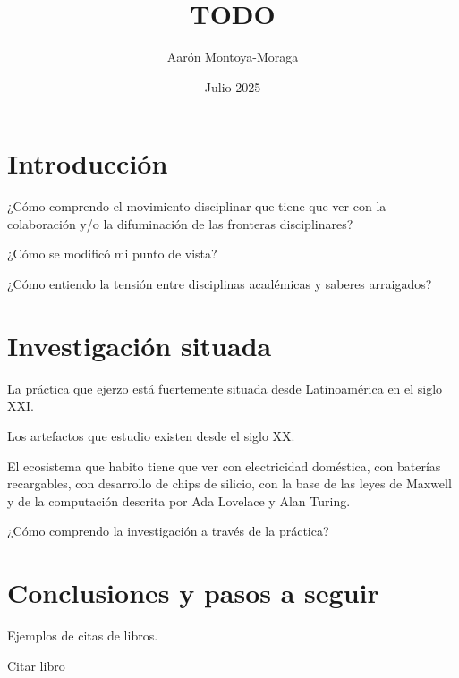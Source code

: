 \documentclass{article}
\title{TODO}
\author{Aarón Montoya-Moraga}
\date{Julio 2025}
\begin{document}
\maketitle

\renewcommand*\contentsname{Tabla de contenidos}
\tableofcontents

\section{Introducción}


¿Cómo comprendo el movimiento disciplinar que tiene que ver con la colaboración y/o la difuminación de las fronteras disciplinares?

¿Cómo se modificó mi punto de vista?

¿Cómo entiendo la tensión entre disciplinas académicas y saberes arraigados?

\section{Investigación situada}

La práctica que ejerzo está fuertemente situada desde Latinoamérica en el siglo XXI.

Los artefactos que estudio existen desde el siglo XX.

El ecosistema que habito tiene que ver con electricidad doméstica, con baterías recargables, con desarrollo de chips de silicio, con la base de las leyes de Maxwell y de la computación descrita por Ada Lovelace y Alan Turing.


¿Cómo comprendo la investigación a través de la práctica?




\section{Conclusiones y pasos a seguir}

Ejemplos de citas de libros.

Citar libro \cite{korgBerlin}


\printbibliography[title={Bibliografía}, heading=bibintoc]
\end{document}
